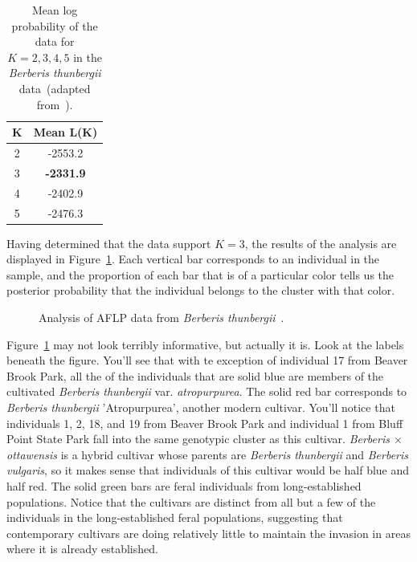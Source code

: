 \documentclass[12pt]{article}
\begin{document}
\begin{table}
\begin{center}
\begin{tabular}{cc}
\hline\hline
K & Mean L(K) \\
\hline
2 & -2553.2 \\
3 & {\bf -2331.9} \\
4 & -2402.9 \\
5 & -2476.3 \\
\hline
\end{tabular}
\end{center}
\caption{Mean log probability of the data for $K=2,3,4,5$ in the {\it
    Berberis thunbergii\/} data~(adapted
  from~\cite{Lubell-etal-2008}).}\label{table:berberis-k}
\end{table}

Having determined that the data support $K=3$, the results of the
analysis are displayed in Figure~\ref{fig:lubell-structure}. Each
vertical bar corresponds to an individual in the sample, and the
proportion of each bar that is of a particular color tells us the
posterior probability that the individual belongs to the cluster with
that color.

\begin{figure}
\caption{Analysis of AFLP data from {\it Berberis
    thunbergii}~\cite{Lubell-etal-2008}.}\label{fig:lubell-structure} 
\end{figure}

Figure~\ref{fig:lubell-structure} may not look terribly informative,
but actually it is. Look at the labels beneath the figure. You'll see
that with te exception of individual 17 from Beaver Brook Park, all
the of the individuals that are solid blue are members of the
cultivated {\it Berberis thunbergii\/} var. {\it atropurpurea}. The
solid red bar corresponds to {\it Berberis thunbergii\/}
'Atropurpurea', another modern cultivar. You'll notice that
individuals 1, 2, 18, and 19 from Beaver Brook Park and individual 1
from Bluff Point State Park fall into the same genotypic cluster as
this cultivar. {\it Berberis $\times$ottawensis} is a hybrid cultivar
whose parents are {\it Berberis thunbergii\/} and {\it Berberis
  vulgaris\/}, so it makes sense that individuals of this cultivar
would be half blue and half red. The solid green bars are feral
individuals from long-established populations. Notice that the
cultivars are distinct from all but a few of the individuals in the
long-established feral populations, suggesting that contemporary
cultivars are doing relatively little to maintain the invasion in
areas where it is already established.
\end{document}
